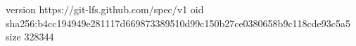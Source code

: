 version https://git-lfs.github.com/spec/v1
oid sha256:b4cc194949e281117d669873389510d99c150b27ce0380658b9c118cde93c5a5
size 328344
